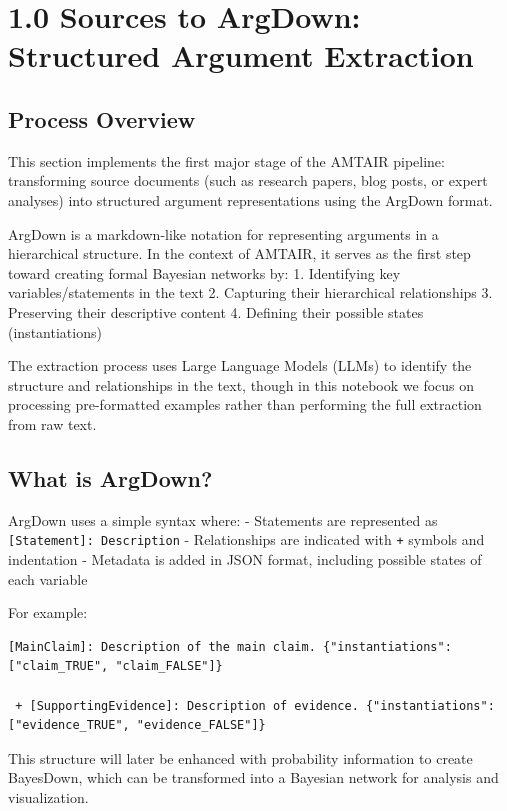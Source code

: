 \documentclass[
  11pt,
  letterpaper,
]{book}
\begin{document}
\section{1.0 Sources to ArgDown: Structured Argument
Extraction}\label{sources-to-argdown-structured-argument-extraction}

\subsection{Process Overview}\label{process-overview}

This section implements the first major stage of the AMTAIR pipeline:
transforming source documents (such as research papers, blog posts, or
expert analyses) into structured argument representations using the
ArgDown format.

ArgDown is a markdown-like notation for representing arguments in a
hierarchical structure. In the context of AMTAIR, it serves as the first
step toward creating formal Bayesian networks by: 1. Identifying key
variables/statements in the text 2. Capturing their hierarchical
relationships 3. Preserving their descriptive content 4. Defining their
possible states (instantiations)

The extraction process uses Large Language Models (LLMs) to identify the
structure and relationships in the text, though in this notebook we
focus on processing pre-formatted examples rather than performing the
full extraction from raw text.

\subsection{What is ArgDown?}\label{what-is-argdown}

ArgDown uses a simple syntax where: - Statements are represented as
\texttt{{[}Statement{]}:\ Description} - Relationships are indicated
with \texttt{+} symbols and indentation - Metadata is added in JSON
format, including possible states of each variable

For example:

\begin{verbatim}
[MainClaim]: Description of the main claim. {"instantiations": ["claim_TRUE", "claim_FALSE"]}

 + [SupportingEvidence]: Description of evidence. {"instantiations": ["evidence_TRUE", "evidence_FALSE"]}
\end{verbatim}

This structure will later be enhanced with probability information to
create BayesDown, which can be transformed into a Bayesian network for
analysis and visualization.
\end{document}
